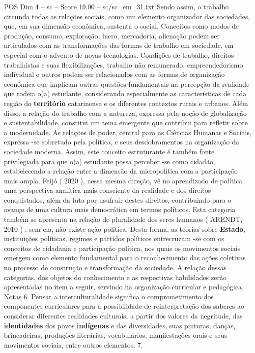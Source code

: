 \begin{textsample}{POS Dim 4 – sc – Score 19.00 – sc/sc\_em\_31.txt}
Sendo assim, o trabalho circunda todas as relações sociais, como um elemento organizador das sociedades, que, em sua dimensão econômica, sustenta o social.
Conceitos como modos de produção, consumo, exploração, lucro, mercadoria, alienação podem ser articulados com as transformações das formas de trabalho em sociedade, em especial com o advento de novas tecnologias.
Condições de trabalho, direitos trabalhistas e suas flexibilizações, trabalho não remunerado, empreendedorismo individual e outros podem ser relacionados com as formas de organização econômica que implicam outras questões fundamentais na percepção da realidade que rodeia o(a) estudante, considerando especialmente as características de cada região do \textbf{território} catarinense e os diferentes contextos rurais e urbanos.
Além disso, a relação do trabalho com a natureza, expressa pela noção de globalização e sustentabilidade, constitui um tema emergente que contribui para refletir sobre a modernidade.
As relações de poder, central para as Ciências Humanas e Sociais, expressa -se sobretudo pela política, e seus desdobramentos na organização da sociedade moderna.
Assim, este conceito estruturante é também fonte privilegiada para que o(a) estudante possa perceber -se como cidadão, estabelecendo a relação entre a dimensão da micropolítica com a participação mais ampla.
Feijó ( 2020 ), nessa mesma direção, vê no aprendizado de política uma perspectiva analítica mais consciente da realidade e dos direitos conquistados, além da luta por usufruir destes direitos, contribuindo para o avanço de uma cultura mais democrática em termos políticos.
Esta categoria também se apresenta na relação de pluralidade dos seres humanos ( ARENDT, 2010 ) ; sem ela, não existe ação política.
Desta forma, as teorias sobre \textbf{Estado}, instituições políticas, regimes e partidos políticos entrecruzam -se com os conceitos de cidadania e participação política, nos quais os movimentos sociais emergem como elemento fundamental para o reconhecimento das ações coletivas no processo de construção e transformação da sociedade.
A relação dessas categorias, dos objetos do conhecimento e as respectivas habilidades serão apresentadas no item a seguir, servindo na organização curricular e pedagógica.
Notas 6.
Pensar a interculturalidade significa o comprometimento dos componentes curriculares para a possibilidade de reinterpretação dos saberes ao considerar diferentes realidades culturais, a partir dos valores da negritude, das \textbf{identidades} dos povos \textbf{indígenas} e das diversidades, suas pinturas, danças, brincadeiras, produções literárias, vocabulários, manifestações orais e seus movimentos sociais, entre outros elementos. 7.

\end{textsample}
